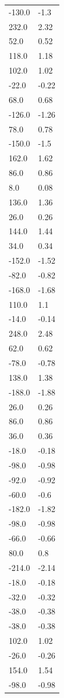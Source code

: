 \begin{longtable}{ll}
-130.0 & -1.3 \\
232.0 & 2.32 \\
52.0 & 0.52 \\
118.0 & 1.18 \\
102.0 & 1.02 \\
-22.0 & -0.22 \\
68.0 & 0.68 \\
-126.0 & -1.26 \\
78.0 & 0.78 \\
-150.0 & -1.5 \\
162.0 & 1.62 \\
86.0 & 0.86 \\
8.0 & 0.08 \\
136.0 & 1.36 \\
26.0 & 0.26 \\
144.0 & 1.44 \\
34.0 & 0.34 \\
-152.0 & -1.52 \\
-82.0 & -0.82 \\
-168.0 & -1.68 \\
110.0 & 1.1 \\
-14.0 & -0.14 \\
248.0 & 2.48 \\
62.0 & 0.62 \\
-78.0 & -0.78 \\
138.0 & 1.38 \\
-188.0 & -1.88 \\
26.0 & 0.26 \\
86.0 & 0.86 \\
36.0 & 0.36 \\
-18.0 & -0.18 \\
-98.0 & -0.98 \\
-92.0 & -0.92 \\
-60.0 & -0.6 \\
-182.0 & -1.82 \\
-98.0 & -0.98 \\
-66.0 & -0.66 \\
80.0 & 0.8 \\
-214.0 & -2.14 \\
-18.0 & -0.18 \\
-32.0 & -0.32 \\
-38.0 & -0.38 \\
-38.0 & -0.38 \\
102.0 & 1.02 \\
-26.0 & -0.26 \\
154.0 & 1.54 \\
-98.0 & -0.98 \\

\end{longtable}
